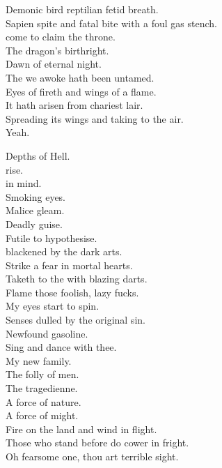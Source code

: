 Demonic bird reptilian  fetid breath. \\
Sapien spite and fatal bite with a foul gas stench. \\
 come to claim the throne. \\
The dragon's birthright. \\
Dawn of eternal night. \\

The  we awoke hath been untamed. \\
Eyes of fireth and wings of a flame. \\
It hath arisen from chariest lair. \\
Spreading its wings and taking to the air. \\

Yeah. \\



Depths of Hell. \\
 rise. \\
 in mind. \\
Smoking eyes. \\
Malice gleam. \\
Deadly guise. \\
Futile to hypothesise. \\
 blackened by the dark arts. \\
Strike a fear in mortal hearts. \\
Taketh to the  with blazing darts. \\
Flame those foolish, lazy fucks. \\

My eyes start to spin. \\
Senses dulled by the original sin. \\
Newfound gasoline. \\
Sing and dance with thee. \\
My new family. \\
The folly of men. \\
The tragedienne. \\
A force of nature. \\
A force of might. \\
Fire on the land and wind in flight. \\
Those who stand before do cower in fright. \\
Oh fearsome one, thou art terrible sight. \\


